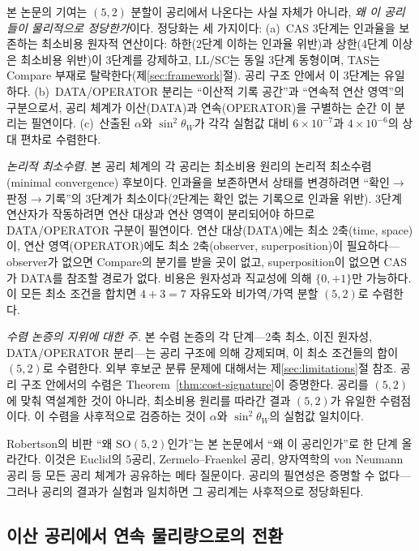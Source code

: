 \documentclass[entropy,article,submit,pdftex,oneauthor]{Definitions/mdpi}
\begin{document}
본 논문의 기여는 $(5,2)$ 분할이 공리에서 나온다는 사실 자체가 아니라, \emph{왜 이 공리들이 물리적으로 정당한가}이다. 정당화는 세 가지이다: (a)~CAS 3단계는 인과율을 보존하는 최소비용 원자적 연산이다: 하한(2단계 이하는 인과율 위반)과 상한(4단계 이상은 최소비용 위반)이 3단계를 강제하고, LL/SC는 동일 3단계 동형이며, TAS는 Compare 부재로 탈락한다(제\ref{sec:framework}절). 공리 구조 안에서 이 3단계는 유일하다. (b)~DATA/OPERATOR 분리는 ``이산적 기록 공간''과 ``연속적 연산 영역''의 구분으로서, 공리 체계가 이산(DATA)과 연속(OPERATOR)을 구별하는 순간 이 분리는 필연이다. (c)~산출된 $\alpha$와 $\sin^2\theta_W$가 각각 실험값 대비 $6 \times 10^{-7}$과 $4 \times 10^{-6}$의 상대 편차로 수렴한다.

\emph{논리적 최소수렴.} 본 공리 체계의 각 공리는 최소비용 원리의 논리적 최소수렴(minimal convergence) 후보이다. 인과율을 보존하면서 상태를 변경하려면 ``확인$\to$판정$\to$기록''의 3단계가 최소이다(2단계는 확인 없는 기록으로 인과율 위반). 3단계 연산자가 작동하려면 연산 대상과 연산 영역이 분리되어야 하므로 DATA/OPERATOR 구분이 필연이다. 연산 대상(DATA)에는 최소 2축(time, space)이, 연산 영역(OPERATOR)에도 최소 2축(observer, superposition)이 필요하다---observer가 없으면 Compare의 분기를 받을 곳이 없고, superposition이 없으면 CAS가 DATA를 참조할 경로가 없다. 비용은 원자성과 직교성에 의해 $\{0, +1\}$만 가능하다. 이 모든 최소 조건을 합치면 $4 + 3 = 7$ 자유도와 비가역/가역 분할 $(5,2)$로 수렴한다.

\emph{수렴 논증의 지위에 대한 주.} 본 수렴 논증의 각 단계---2축 최소, 이진 원자성, DATA/OPERATOR 분리---는 공리 구조에 의해 강제되며, 이 최소 조건들의 합이 $(5,2)$로 수렴한다. 외부 후보군 분류 문제에 대해서는 제\ref{sec:limitations}절 참조. 공리 구조 안에서의 수렴은 Theorem~\ref{thm:cost-signature}이 증명한다. 공리를 $(5,2)$에 맞춰 역설계한 것이 아니라, 최소비용 원리를 따라간 결과 $(5,2)$가 유일한 수렴점이다. 이 수렴을 사후적으로 검증하는 것이 $\alpha$와 $\sin^2\theta_W$의 실험값 일치이다.

Robertson의 비판 ``왜 $\mathrm{SO}(5,2)$인가''는 본 논문에서 ``왜 이 공리인가''로 한 단계 올라간다. 이것은 Euclid의 5공리, Zermelo--Fraenkel 공리, 양자역학의 von Neumann 공리 등 모든 공리 체계가 공유하는 메타 질문이다. 공리의 필연성은 증명할 수 없다---그러나 공리의 결과가 실험과 일치하면 그 공리계는 사후적으로 정당화된다.

\subsection{이산 공리에서 연속 물리량으로의 전환}
\end{document}
